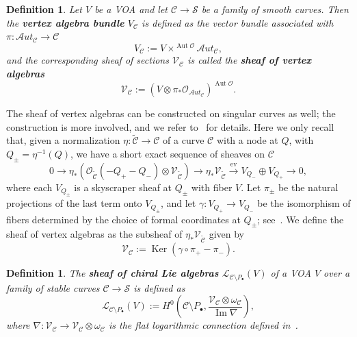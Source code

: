 \documentclass[12pt,a4paper,reqno]{amsart}
\numberwithin{equation}{section}
\newtheorem{definition}[theorem]{Definition}
\theoremstyle{definition}
\newcommand{\Aut}{\operatorname{Aut}}
\newcommand{\AAut}{\mathscr{A}\textit{ut}}
\renewcommand{\ker}{\operatorname{Ker}}
\newcommand{\im}{\operatorname{Im}}
\renewcommand{\S}{\mathcal{S}}
\newcommand{\CCC}{\mathscr{C}}
\newcommand{\LL}{\mathcal{L}}
\def\O{\mathcal{O}}
\def\ra{\rightarrow}
\begin{document}
\begin{definition}
    Let $V$ be a VOA and let $\CCC \rightarrow \S$ be a family of smooth curves. Then the \textbf{vertex algebra bundle} $V_\CCC$ is defined as the vector bundle associated with $\pi: \AAut_\CCC \rightarrow \CCC$
    \begin{equation}
        V_{\mathscr{C}} := V \times^{\Aut \O} \AAut_\mathscr{C},
    \end{equation}
    and the corresponding sheaf of sections $\mathscr{V}_\CCC$ is called the \textbf{sheaf of vertex algebras}
    \begin{equation}
        \mathscr{V}_\CCC := (V \otimes \pi_* \O_{\AAut_\CCC})^{\Aut \O}.
    \end{equation}
\end{definition}
The sheaf of vertex algebras can be constructed on singular curves as well; the construction is more involved, and we refer to~\cite[Section 2.5]{DGT2} for details. Here we only recall that, given a normalization $\eta: \widetilde{\CCC} \rightarrow \CCC$ of a curve $\CCC$ with a node at $Q$, with $Q_\pm = \eta^{-1}(Q)$, we have a short exact sequence of sheaves on $\CCC$
\begin{equation}
    0 \rightarrow \eta_* \left(\O_{\widetilde{\CCC}}(-Q_+-Q_-) \otimes \mathscr{V}_{\widetilde{\CCC}}\right) \rightarrow \eta_*\mathscr{V}_{\widetilde{\CCC}} \stackrel{\mathrm{ev}}{\longrightarrow} V_{Q_-} \oplus V_{Q_+} \rightarrow 0,
\end{equation}
where each $V_{Q_\pm}$ is a skyscraper sheaf at $Q_\pm$ with fiber $V$. Let $\pi_{\pm}$ be the natural projections of the last term onto $V_{Q_\pm}$, and let $\gamma: V_{Q_+}\ra V_{Q_-}$ be the isomorphism of fibers determined by the choice of formal coordinates at $Q_\pm$; see~\cite[Section 2.5]{DGT2}. We define the sheaf of vertex algebras as the subsheaf of $\eta_*\mathscr{V}_{\widetilde{\CCC}}$ given by
\begin{equation}
    \mathscr{V}_\CCC := \ker \left( \gamma \circ \pi_+ - \pi_- \right).
\end{equation}

\begin{definition}\label{df:chiralLie}
    The \textbf{sheaf of chiral Lie algebras} $\LL_{\mathscr{C}\setminus P_\bullet}(V)$  of a VOA $V$ over a family of stable curves $\CCC\rightarrow \mathcal{S}$ is defined as
    \begin{equation}
        \LL_{\CCC\setminus P_\bullet}(V) := H^0\left( \CCC \setminus P_\bullet, \frac{\mathscr{V}_\CCC \otimes \omega_\CCC}{\im \nabla}\right),
    \end{equation}
    where $\nabla: \mathscr{V}_\CCC \rightarrow \mathscr{V}_\CCC \otimes \omega_\CCC$ is the flat logarithmic connection defined in~\cite[Proposition 3.2]{DGT1}.
\end{definition}
\end{document}
